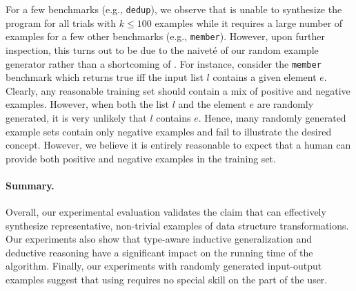 For a few benchmarks (e.g., {\tt dedup}), we observe that \sys is
unable to synthesize the program for all trials with $k \le 100$
examples while it requires a large number of examples for a few other
benchmarks (e.g., {\tt member}). However, upon further inspection,
this turns out to be due to the naivet\'e of our random example
generator rather than a shortcoming of \sys. For instance, consider
the {\tt member} benchmark which returns true iff the input list $l$
contains a given element $e$. Clearly, any reasonable training set
should contain a mix of positive and negative examples.  However, when
both the list $l$ and the element $e$ are randomly generated, it is
very unlikely that $l$ contains $e$. Hence, many randomly generated
example sets contain only negative examples and fail to illustrate the
desired concept. However, we believe it is entirely reasonable to
expect that a human can provide both positive and negative examples in
the training set.




\paragraph{Summary.} Overall, our experimental evaluation validates
the claim that \sys can effectively synthesize representative,
non-trivial examples of data structure transformations.  Our
experiments also show that type-aware inductive generalization and
deductive reasoning have a significant impact on the running time of
the algorithm. Finally, our experiments with randomly generated
input-output examples suggest that using \sys requires no special skill
on the part of the user.




